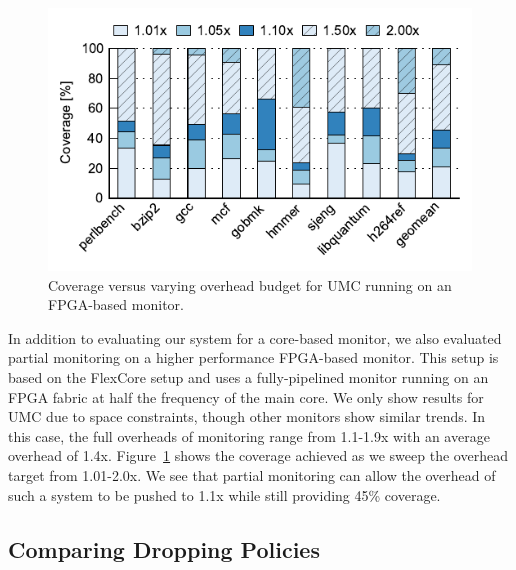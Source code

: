 \begin{figure}
  \begin{center}
    \vspace{-0.1in}
    \includegraphics[width=\linewidth]{figs/data_fpga_umc_sweep.pdf}
    \vspace{-0.2in}
    \caption{Coverage versus varying overhead budget for UMC running on an FPGA-based monitor.}
    \label{fig:evaluation.fpga_umc_sweep}
    \vspace{-0.3in}
  \end{center}
\end{figure}

In addition to evaluating our system for a core-based monitor, we also
evaluated partial monitoring on a higher performance FPGA-based monitor. This
setup is based on the FlexCore \cite{flexcore-micro10} setup and uses a
fully-pipelined monitor running on an FPGA fabric at half the frequency of the
main core. We only show results for UMC due to space constraints, though other
monitors show similar trends. In this case, the full overheads of
monitoring range from 1.1-1.9x with an average overhead of 1.4x. Figure~\ref{fig:evaluation.fpga_umc_sweep} shows
the coverage achieved as we sweep the overhead target from 1.01-2.0x. We see that partial
monitoring can allow the overhead of such a system to be pushed to 1.1x
while still providing 45\% coverage.

\subsection{Comparing Dropping Policies}

